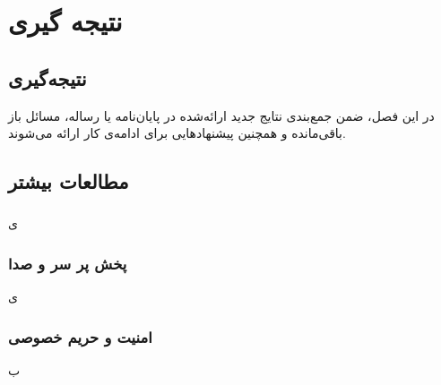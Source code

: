 \chapter{نتیجه گیری}
\section{نتیجه‌گیری}

در این فصل، ضمن جمع‌بندی نتایج جدید ارائه‌شده در پایان‌نامه یا رساله،
مسائل باز باقی‌مانده و همچنین پیشنهادهایی برای ادامه‌ی کار ارائه می‌شوند.
\section{مطالعات بیشتر}

\subsection{
}
ی
\subsection{پخش پر سر و صدا}
ی
\subsection{ امنیت و حریم خصوصی}
ب
